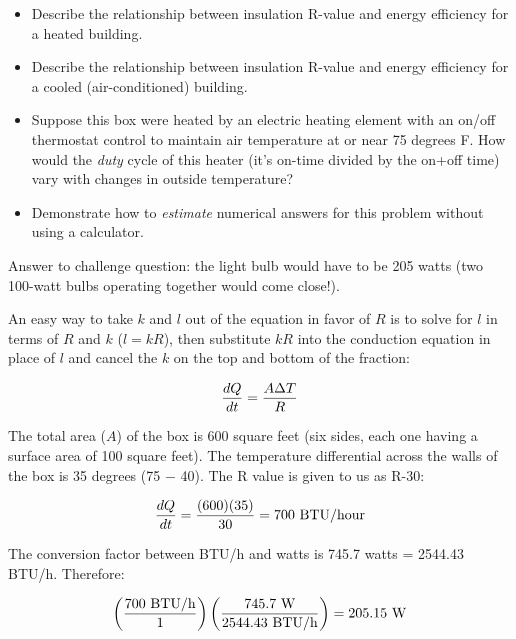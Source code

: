 \begin{itemize}
\item{} Describe the relationship between insulation R-value and energy efficiency for a heated building. 
\item{} Describe the relationship between insulation R-value and energy efficiency for a cooled (air-conditioned) building. 
\item{} Suppose this box were heated by an electric heating element with an on/off thermostat control to maintain air temperature at or near 75 degrees F.  How would the {\it duty} cycle of this heater (it's on-time divided by the on+off time) vary with changes in outside temperature?
\item{} Demonstrate how to {\it estimate} numerical answers for this problem without using a calculator.
\end{itemize}







Answer to challenge question: the light bulb would have to be 205 watts (two 100-watt bulbs operating together would come close!).







An easy way to take $k$ and $l$ out of the equation in favor of $R$ is to solve for $l$ in terms of $R$ and $k$ ($l = kR$), then substitute $kR$ into the conduction equation in place of $l$ and cancel the $k$ on the top and bottom of the fraction:

$${dQ \over dt} = {A {\Delta T} \over R}$$

The total area ($A$) of the box is 600 square feet (six sides, each one having a surface area of 100 square feet).  The temperature differential across the walls of the box is 35 degrees (75 $-$ 40).  The R value is given to us as R-30:

$${dQ \over dt} = {(600) (35) \over 30} = 700 \hbox{ BTU/hour}$$

The conversion factor between BTU/h and watts is 745.7 watts = 2544.43 BTU/h.  Therefore:

$$\left({700 \hbox{ BTU/h} \over 1}\right) \left( {745.7 \hbox{ W} \over 2544.43 \hbox{ BTU/h}} \right) = 205.15 \hbox{ W}$$







